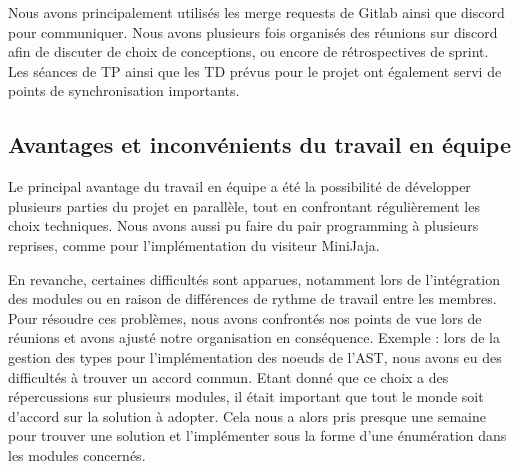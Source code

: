 Nous avons principalement utilisés les merge requests de Gitlab ainsi que discord pour communiquer.
Nous avons plusieurs fois organisés des réunions sur discord afin de discuter de choix de conceptions, ou encore de rétrospectives de sprint.
Les séances de TP ainsi que les TD prévus pour le projet ont également servi de points de synchronisation importants.


\subsection{Avantages et inconvénients du travail en équipe}

Le principal avantage du travail en équipe a été la possibilité de développer plusieurs parties du projet en parallèle, tout en confrontant régulièrement les choix techniques.
Nous avons aussi pu faire du pair programming à plusieurs reprises, comme pour l'implémentation du visiteur MiniJaja.

\vspace{0.5cm}
En revanche, certaines difficultés sont apparues, notamment lors de l’intégration des modules ou en raison de différences de rythme de travail entre les membres.
Pour résoudre ces problèmes, nous avons confrontés nos points de vue lors de réunions et avons ajusté notre organisation en conséquence.
Exemple : lors de la gestion des types pour l'implémentation des noeuds de l'AST, nous avons eu des difficultés à trouver un accord commun.
Etant donné que ce choix a des répercussions sur plusieurs modules, il était important que tout le monde soit d'accord sur la solution à adopter.
Cela nous a alors pris presque une semaine pour trouver une solution et l'implémenter sous la forme d'une énumération dans les modules concernés.